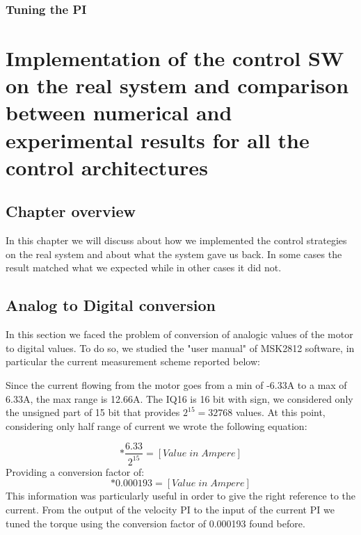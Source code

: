 \documentclass[12pt]{article}
\begin{document}
\subsubsection*{Tuning the PI}

\section{Implementation of the control SW on the real system and comparison between numerical and experimental results for all the control architectures}
\subsection{Chapter overview}
In this chapter we will discuss about how we implemented the control strategies on the real system 
and about what the system gave us back. In some cases the result matched what we expected while in 
other cases it did not.
\subsection{Analog to Digital conversion}
In this section we faced the problem of conversion of analogic values of the motor to digital values.
To do so, we studied the "user manual" of MSK2812 software, in particular the current measurement scheme reported below:


Since the current flowing from the motor goes from a min of -6.33A to a max of 6.33A, the max range is 12.66A.
The IQ16 is 16 bit with sign, we considered only the unsigned part of 15 bit that provides $2^{15}=32768$ values.
At this point, considering only half range of current we wrote the following equation:

\begin{equation}
[Value \; in \; Bit]*\frac{6.33}{2^{15}} = [Value \; in \; Ampere]
\end{equation}
Providing a conversion factor of:
\begin{equation}
[Value \; in \: Bit] * 0.000193 = [Value \; in \; Ampere]
\end{equation}
This information was particularly useful in order to give the right reference to the current.
From the output of the velocity PI to the input of the current PI we tuned the torque using the conversion factor of 0.000193 found before.
\end{document}
